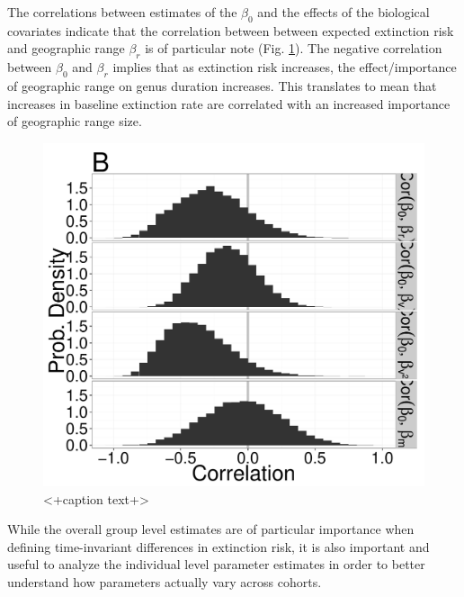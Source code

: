 \documentclass[12pt,letterpaper]{article}
\begin{document}
The correlations between estimates of the \(\beta_{0}\) and the effects of the biological covariates indicate that the correlation between between expected extinction risk and geographic range \(\beta_{r}\) is of particular note (Fig. \ref{fig:corr}). The negative correlation between \(\beta_{0}\) and \(\beta_{r}\) implies that as extinction risk increases, the effect/importance of geographic range on genus duration increases. This translates to mean that increases in baseline extinction rate are correlated with an increased importance of geographic range size. %
\begin{figure}[ht]
  \centering
  \includegraphics[height = 0.5\textheight,width=\textwidth,keepaspectratio=true]{figure/correlation_marginal}
  \caption{<+caption text+>}
  \label{fig:corr}
\end{figure}

While the overall group level estimates are of particular importance when defining time-invariant differences in extinction risk, it is also important and useful to analyze the individual level parameter estimates in order to better understand how parameters actually vary across cohorts.
\end{document}
